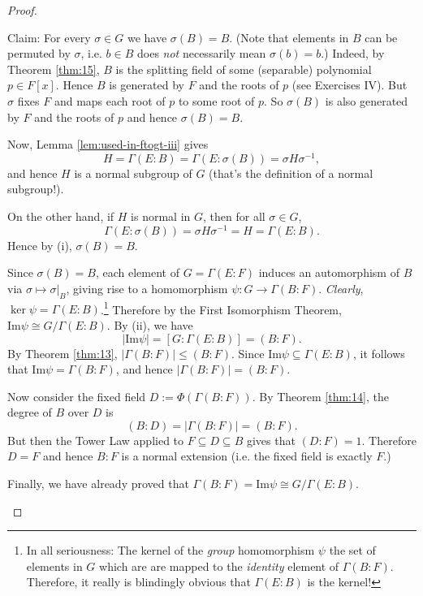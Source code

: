 \begin{theorem}
\begin{proof}
\begin{enumerate}[(i)]
			Claim: For every $\sigma \in G$ we have $\sigma(B) = B$. (Note that elements in $B$ can be permuted by $\sigma$, i.e. $b \in B$ does \emph{not} necessarily mean $\sigma(b) = b$.) Indeed, by Theorem \ref{thm:15}, $B$ is the splitting field of some (separable) polynomial $p \in F[x]$. Hence $B$ is generated by $F$ and the roots of $p$ (see Exercises IV). But $\sigma$ fixes $F$ and maps each root of $p$ to some root of $p$. So $\sigma(B)$ is also generated by $F$ and the roots of $p$ and hence $\sigma(B) = B$.
			
			Now, Lemma \ref{lem:used-in-ftogt-iii} gives
			\[
				H = \Gamma(E : B) = \Gamma(E : \sigma(B)) = \sigma H \sigma^{-1},
			\]
			and hence $H$ is a normal subgroup of $G$ (that's the definition of a normal subgroup!).
			
			On the other hand, if $H$ is normal in $G$, then for all $\sigma \in G$,
			\[
				\Gamma(E : \sigma(B)) = \sigma H \sigma^{-1} = H = \Gamma(E : B).
			\]
			Hence by (i), $\sigma(B) = B$.
			
			Since $\sigma(B) = B$, each element of $G = \Gamma(E : F)$ induces an automorphism of $B$ via $\sigma \mapsto \sigma|_B$, giving rise to a homomorphism $\psi : G \to \Gamma(B : F)$. \emph{Clearly}, $\ker{\psi} = \Gamma(E : B)$.\footnote{In all seriousness: The kernel of the \emph{group} homomorphism $\psi$  the set of elements in $G$ which are are mapped to the \emph{identity} element of $\Gamma(B : F)$. Therefore, it really is blindingly obvious that $\Gamma(E : B)$ is the kernel!} Therefore by the First Isomorphism Theorem, $\text{Im}{\psi} \cong G / \Gamma(E : B)$. By (ii), we have
			\[
				|\text{Im}{\psi}| = [G : \Gamma(E : B)] = (B : F).
			\]
			By Theorem \ref{thm:13}, $|\Gamma(B : F)| \leq (B : F)$. Since $\text{Im}{\psi} \subseteq \Gamma(E : B)$, it follows that $\text{Im}{\psi} = \Gamma(B : F)$, and hence $|\Gamma(B : F)| = (B : F)$.
			
			Now consider the fixed field $D := \Phi(\Gamma(B : F))$. By Theorem \ref{thm:14}, the degree of $B$ over $D$ is
			\[
				(B : D) = |\Gamma(B : F)| = (B : F).
			\]
			But then the Tower Law applied to $F \subseteq D \subseteq B$ gives that $(D : F) = 1$. Therefore $D = F$ and hence $B : F$ is a normal extension (i.e. the fixed field is exactly $F$.)
			
			Finally, we have already proved that $\Gamma(B : F) = \text{Im}{\psi} \cong G / \Gamma(E : B)$.
		\end{enumerate}
	\end{proof}
\end{theorem}

